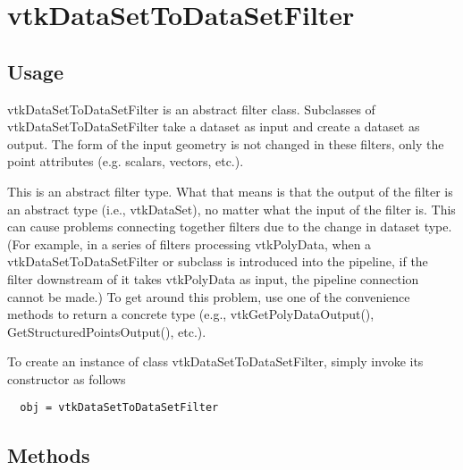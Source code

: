 \section{vtkDataSetToDataSetFilter}

\subsection{Usage}

 vtkDataSetToDataSetFilter is an abstract filter class. Subclasses of
 vtkDataSetToDataSetFilter take a dataset as input and create a dataset as
 output. The form of the input geometry is not changed in these filters,
 only the point attributes (e.g. scalars, vectors, etc.).

 This is an abstract filter type. What that means is that the output of the
 filter is an abstract type (i.e., vtkDataSet), no matter what the input of
 the filter is. This can cause problems connecting together filters due to
 the change in dataset type. (For example, in a series of filters
 processing vtkPolyData, when a vtkDataSetToDataSetFilter or subclass is
 introduced into the pipeline, if the filter downstream of it takes
 vtkPolyData as input, the pipeline connection cannot be made.) To get
 around this problem, use one of the convenience methods to return a
 concrete type (e.g., vtkGetPolyDataOutput(), GetStructuredPointsOutput(),
 etc.).

To create an instance of class vtkDataSetToDataSetFilter, simply
invoke its constructor as follows
\begin{verbatim}
  obj = vtkDataSetToDataSetFilter
\end{verbatim}
\subsection{Methods}


